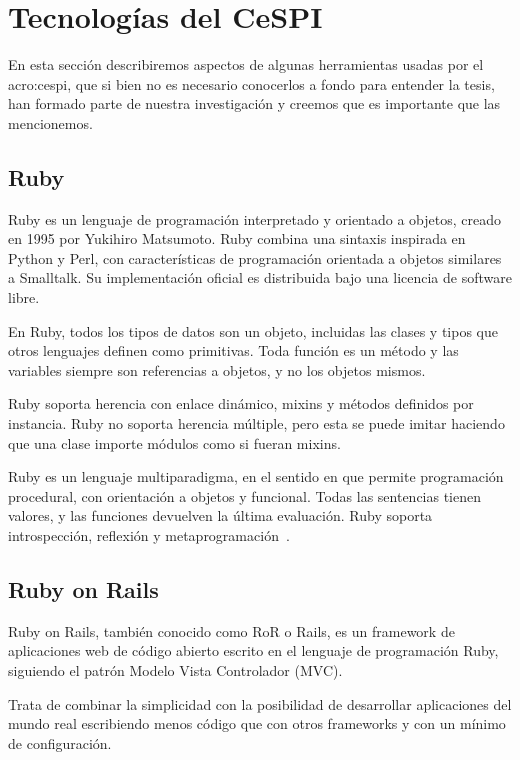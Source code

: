 \section{Tecnologías del CeSPI}
\label{anexo:A}

En esta sección describiremos aspectos de algunas herramientas usadas por el
\gls{acro:cespi}, que si bien no es necesario conocerlos a fondo para entender
la tesis, han formado parte de nuestra investigación y creemos que es
importante que las mencionemos.

\subsection{Ruby}

Ruby es un lenguaje de programación interpretado y orientado a objetos, creado
en 1995 por Yukihiro Matsumoto. Ruby combina una sintaxis inspirada en Python y
Perl, con características de programación orientada a objetos similares a
Smalltalk. Su implementación oficial es distribuida bajo una licencia de
software libre.

En Ruby, todos los tipos de datos son un objeto, incluidas las clases y tipos
que otros lenguajes definen como primitivas. Toda función es un método y las
variables siempre son referencias a objetos, y no los objetos mismos.

Ruby soporta herencia con enlace dinámico, mixins y métodos definidos por
instancia. Ruby no soporta herencia múltiple, pero esta se puede imitar
haciendo que una clase importe módulos como si fueran mixins.

Ruby es un lenguaje multiparadigma, en el sentido en que permite programación
procedural, con orientación a objetos y funcional. Todas las sentencias tienen
valores, y las funciones devuelven la última evaluación. Ruby soporta
introspección, reflexión y metaprogramación~\cite{ruby}.

\subsection{Ruby on Rails}

Ruby on Rails, también conocido como RoR o Rails, es un framework de
aplicaciones web de código abierto escrito en el lenguaje de programación Ruby,
siguiendo el patrón Modelo Vista Controlador (MVC).

Trata de combinar la simplicidad con la posibilidad de desarrollar aplicaciones
del mundo real escribiendo menos código que con otros frameworks y con un
mínimo de configuración.

